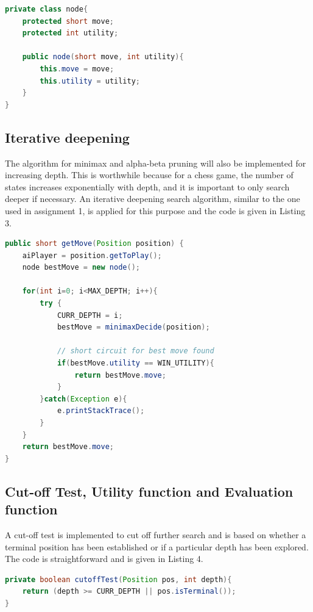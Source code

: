 \documentclass[9.5pt]{extarticle}
\begin{document}
\begin{lstlisting}[language=java,caption={Wrapper class so that minimax and alpha-beta search can return multiple output}]
private class node{
	protected short move;
	protected int utility;

	public node(short move, int utility){
		this.move = move;
		this.utility = utility;
	}
}
\end{lstlisting}

\subsection{Iterative deepening}

The algorithm for minimax and alpha-beta pruning will also be implemented for increasing depth. This is worthwhile because for a chess game, the number of states increases exponentially with depth, and it is important to only search deeper if necessary. An iterative deepening search algorithm, similar to the one used in assignment 1, is applied for this purpose and the code is given in Listing 3.

\begin{lstlisting}[language=java,caption={Java code for Iterative deepening search}]
public short getMove(Position position) {
	aiPlayer = position.getToPlay();
	node bestMove = new node();
	
	for(int i=0; i<MAX_DEPTH; i++){
		try {
			CURR_DEPTH = i;
			bestMove = minimaxDecide(position);

			// short circuit for best move found
			if(bestMove.utility == WIN_UTILITY){
				return bestMove.move;
			}
		}catch(Exception e){
			e.printStackTrace();
		}
	}
	return bestMove.move;
}
\end{lstlisting}

\subsection{Cut-off Test, Utility function and Evaluation function}

A cut-off test is implemented to cut off further search and is based on whether a terminal position has been established or if a particular depth has been explored. The code is straightforward and is given in Listing 4.

\begin{lstlisting}[language=java,caption={Java code for cutoffTest}]
private boolean cutoffTest(Position pos, int depth){
	return (depth >= CURR_DEPTH || pos.isTerminal());
}
\end{lstlisting}
\end{document}
